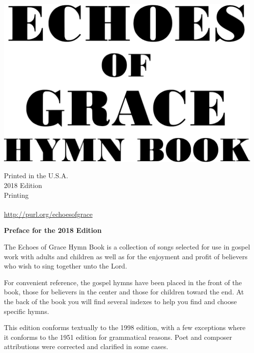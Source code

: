 \documentclass{book}
\begin{document}

\vspace*{1in}

\noindent\hfil\includegraphics[scale=0.06]{booklayout/bodoni-scan}\hfil

\vfill



\pagebreak

\vspace*{\fill}
\begin{center}
Printed in the U.S.A.\\
2018 Edition\\
\the\year{} Printing\\
\\
\url{http://purl.org/echoesofgrace}
\end{center}

\pagebreak


\vspace*{1.5in}
\noindent\hfil{\textbf{Preface for the 2018 Edition}}\hfil

The {\textit{}Echoes of Grace Hymn Book} is a collection of songs selected for
use in gospel work with adults and children as well as for the enjoyment and
profit of believers who wish to sing together unto the Lord.

For convenient reference, the gospel hymns have been placed in the front of the
book, those for believers in the center and those for children toward the end.
At the back of the book you will find several indexes to help you find and
choose specific hymns.

This edition conforms textually to the 1998 edition, with a few exceptions
where it conforms to the 1951 edition for grammatical reasons. Poet and
composer attributions were corrected and clarified in some cases.
\end{document}
